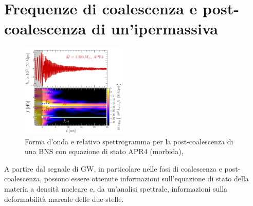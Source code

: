 \section[Frequenze caratteristiche]{Frequenze  di coalescenza e post-coalescenza di un'ipermassiva}
\label{section:frequenze_caratteristiche}
\begin{figure}
	\vspace{-5pt}
	\begin{center}
		\includegraphics[width=0.45\textwidth]{figures/Capitolo_1/GW_spectrogram_APR4-q10-M1300.pdf}
	\end{center}
	\vspace{-10pt}
	\caption{Forma d'onda e relativo spettrogramma per la post-coalescenza di una BNS con equazione di stato APR4 (morbida), \cite{Rezzolla_2016}}
	\label{fig:spettrogramma_postmerger_APR4}
	\vspace{-10pt}
\end{figure}
A partire dal segnale di GW, in particolare nelle fasi di coalescenza e post-coalescenza, possono essere ottenute informazioni sull'equazione di stato della materia a densità nucleare e, da un'analisi spettrale, informazioni sulla deformabilità mareale delle due stelle.\\
